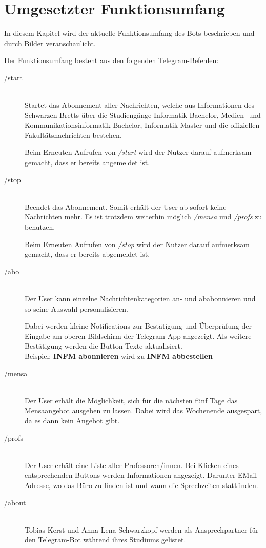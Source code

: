 \chapter{Umgesetzter Funktionsumfang}
In diesem Kapitel wird der aktuelle Funktionsumfang des Bots beschrieben und durch Bilder veranschaulicht.

Der Funktionsumfang besteht aus den folgenden Telegram-Befehlen:

\begin{description}
  \item[/start] \hfill \\
  Startet das Abonnement aller Nachrichten, welche aus Informationen des Schwarzen Bretts über die Studiengänge Informatik Bachelor, Medien- und Kommunikationsinformatik Bachelor, Informatik Master und die offiziellen Fakultätsnachrichten bestehen.

  Beim Erneuten Aufrufen von \emph{/start} wird der Nutzer darauf aufmerksam gemacht, dass er bereits angemeldet ist.
  \item[/stop] \hfill \\
  Beendet das Abonnement. Somit erhält der User ab sofort keine Nachrichten mehr. Es ist trotzdem weiterhin möglich \emph{/mensa} und \emph{/profs} zu benutzen.

  Beim Erneuten Aufrufen von \emph{/stop} wird der Nutzer darauf aufmerksam gemacht, dass er bereits abgemeldet ist.
  \item[/abo] \hfill \\
  Der User kann einzelne Nachrichtenkategorien an- und ababonnieren und so seine Auswahl personalisieren.

  Dabei werden kleine Notifications zur Bestätigung und Überprüfung der Eingabe am oberen Bildschirm der Telegram-App angezeigt. Als weitere Bestätigung werden die Button-Texte aktualisiert. \\
  Beispiel: \textbf{INFM abonnieren} wird zu \textbf{INFM abbestellen}
  \item[/mensa] \hfill \\
  Der User erhält die Möglichkeit, sich für die nächsten fünf Tage das Mensaangebot ausgeben zu lassen. Dabei wird das Wochenende ausgespart, da es dann kein Angebot gibt.
  \item[/profs] \hfill \\
  Der User erhält eine Liste aller Professoren/innen. Bei Klicken eines entsprechenden Buttons werden Informationen angezeigt. Darunter EMail-Adresse, wo das Büro zu finden ist und wann die Sprechzeiten stattfinden.
  \item[/about] \hfill \\
  Tobias Kerst und Anna-Lena Schwarzkopf werden als Ansprechpartner für den Telegram-Bot während ihres Studiums gelistet.

\end{description}
